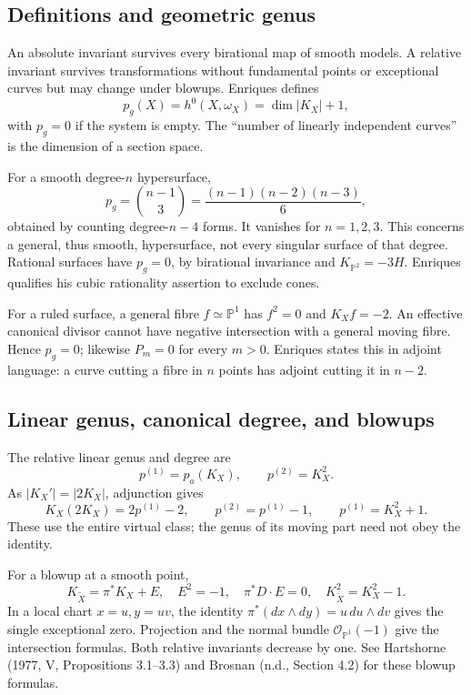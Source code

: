 \subsection{Definitions and geometric genus}

An absolute invariant survives every birational map of smooth models. A relative invariant survives transformations without fundamental points or exceptional curves but may change under blowups. Enriques defines \[
p_g(X)=h^0(X,\omega_X)=\dim|K_X|+1,
\] with \(p_g=0\) if the system is empty. The ``number of linearly independent curves'' is the dimension of a section space.

For a smooth degree-\(n\) hypersurface, \[
p_g=\binom{n-1}{3}=\frac{(n-1)(n-2)(n-3)}6,
\] obtained by counting degree-\(n-4\) forms. It vanishes for \(n=1,2,3\). This concerns a general, thus smooth, hypersurface, not every singular surface of that degree. Rational surfaces have \(p_g=0\), by birational invariance and \(K_{\mathbb{P}^2}=-3H\). Enriques qualifies his cubic rationality assertion to exclude cones.

For a ruled surface, a general fibre \(f\simeq\mathbb{P}^1\) has \(f^2=0\) and \(K_X f=-2\). An effective canonical divisor cannot have negative intersection with a general moving fibre. Hence \(p_g=0\); likewise \(P_m=0\) for every \(m>0\). Enriques states this in adjoint language: a curve cutting a fibre in \(n\) points has adjoint cutting it in \(n-2\).

\subsection{Linear genus, canonical degree, and blowups}

The relative linear genus and degree are \[
p^{(1)}=p_a(K_X),\qquad p^{(2)}=K_X^2.
\] As \(|K_X'|=|2K_X|\), adjunction gives \[
K_X(2K_X)=2p^{(1)}-2,\qquad
p^{(2)}=p^{(1)}-1,\qquad p^{(1)}=K_X^2+1.
\] These use the entire virtual class; the genus of its moving part need not obey the identity.

For a blowup at a smooth point, \[
K_{\widetilde X}=\pi^*K_X+E,\quad E^2=-1,\quad
\pi^*D\cdot E=0,\quad K_{\widetilde X}^2=K_X^2-1.
\] In a local chart \(x=u,y=uv\), the identity \(\pi^*(dx\wedge dy)=u\,du\wedge dv\) gives the single exceptional zero. Projection and the normal bundle \(\mathcal O_{\mathbb{P}^1}(-1)\) give the intersection formulas. Both relative invariants decrease by one. See Hartshorne (1977, V, Propositions 3.1--3.3) and Brosnan (n.d., Section 4.2) for these blowup formulas.

